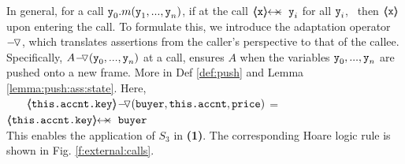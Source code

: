 In general, for a call $\prg{y}_0.m(\prg{y}_1, ..., \prg{y}_n)$, if at the call $\protectedFrom{\prg{x}}{\prg{y}_i}$  for all %
 $\prg{y}_i$, \  then $\inside{\prg{x}}$   upon entering the call. 
To formulate this, we introduce the adaptation operator $\pushSymbolInText$, which translates assertions from the caller's perspective to that of the callee. 
Specifically, $\PushASLong  {(\prg{y}_0, ..., \prg{y}_n)}   A$ at a call, ensures   $A$  when the variables  $\prg{y}_0, ..., \prg{y}_n$ are pushed onto a new frame. More in Def   \ref{def:push} and  Lemma \ref{lemma:push:ass:state}. Here, \\
$\strut \ \ \ \ $  \small $\PushASLong {(\prg{buyer},\prg{this.\myAccount},\prg{price})} {\inside{\prg{this.\myAccount.key}}}$
= $\protectedFrom{\prg{this.\myAccount.key}}{\prg{buyer}}$\\
  \normalsize   This enables the application of $S_3$ in \textbf{(1)}. The corresponding Hoare logic rule is shown in Fig. \ref{f:external:calls}.

